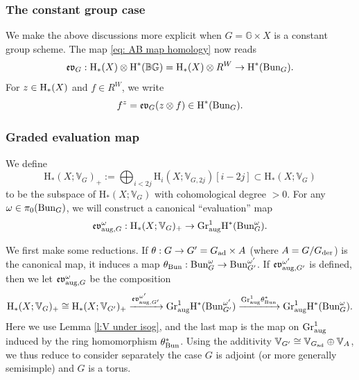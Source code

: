 \documentclass[reqno]{amsart}
\numberwithin{equation}{subsection}
\theoremstyle{definition}
\def\BB{\mathbb{B}}
\def\GG{\mathbb{G}}
\def\VV{\mathbb{V}}
\newcommand{\Bun}{\textup{Bun}}
\newcommand{\Gr}{\textup{Gr}}
\newcommand{\ad}{\textup{ad}}
\newcommand{\der}{\textup{der}}
\newcommand\op{\oplus}
\newcommand\ot{\otimes}
\newcommand{\homog}[2]{\textup{H}_{#1}({#2})}  %
\newcommand{\cohog}[2]{\textup{H}^{#1}({#2})}     %
\newcommand\xr{\xrightarrow}
\renewcommand{\th}{\theta}
\newcommand{\om}{\omega}
\newcommand\aug{\textup{aug}}
\newcommand\frev{\mathfrak{ev}}
\newcommand{\rH}{\ensuremath{\mathrm{H}}\xspace}
\begin{document}
\subsubsection{The constant group case}\label{sss:fz} We make the above discussions more explicit when $G=\GG\times X$ is a constant group scheme. The map \eqref{eq: AB map homology} now reads
\begin{equation*}
\frev_{G}: \homog{*}{X}\ot \cohog{*}{\BB \GG}=\homog{*}{X}\ot R^{W}\to \cohog{*}{\Bun_{G}}.
\end{equation*}
For $z\in \homog{*}{X}$ and $f\in R^{W}$, we write 
\begin{equation}\label{fz}
f^{z}=\frev_{G}(z\ot f)\in \cohog{*}{\Bun_{G}}.
\end{equation}


\subsubsection{Graded evaluation map}
We define  
\begin{equation}\label{eq: hom positive part}
\rH_*(X; \VV_{G})_+  := \bigoplus_{i<2j} \rH_i(X; \VV_{G,2j})[i-2j] \subset \rH_*(X; \VV_{G})
\end{equation}
to be the subspace of $\rH_*(X; \VV_{G})$ with cohomological degree $>0$. For any $\om\in \pi_{0}(\Bun_{G})$, we will construct a canonical ``evaluation'' map
\begin{equation}\label{eq: AB map cohomology 2}
\frev^{\om}_{\aug, G}: \rH_*(X; \VV_{G})_{+} \rightarrow \Gr^1_{\aug} \rH^*(\Bun_G^\omega).
\end{equation}

We first make some reductions. If $\th:G\to G'=G_{\ad}\times A$ (where $A=G/G_{\der}$) is the canonical map, it induces a map $\th_{\Bun}: \Bun^{\om}_{G}\to \Bun^{\om'}_{G'}$. If $\frev^{\om'}_{\aug, G'}$ is defined, then we let $\frev^{\om}_{\aug, G}$ be the composition
\begin{equation*}
\rH_*(X; \VV_{G})_{+}\cong \rH_*(X; \VV_{G'})_{+}\xr{\frev^{\om'}_{\aug, G'}}\Gr^{1}_{\aug}\rH^*(\Bun_{G'}^{\omega'})\xr{\Gr^{1}_{\aug}\th_{\Bun}^{*}}\Gr^{1}_{\aug}\rH^*(\Bun_G^\omega).
\end{equation*}
Here we use Lemma \ref{l:V under isog}, and the last map is the map on $\Gr^{1}_{\aug}$ induced by the ring homomorphism $\th_{\Bun}^{*}$. Using the additivity $\VV_{G'}\cong \VV_{G_{\ad}}\op \VV_{A}$, we thus reduce to consider separately the case $G$ is adjoint (or more generally semisimple) and $G$ is a torus.
\end{document}
